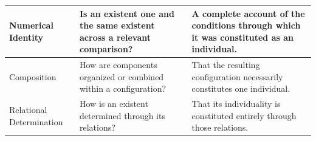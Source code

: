 \begin{table}[htbp]
\begin{tabular}{|p{}|p{}|p{}|}
Numerical Identity
&
Is an existent one and the same existent across a relevant comparison?
&
A complete account of the conditions through which it was constituted as an individual.
\\
\hline

Composition
&
How are components organized or combined within a configuration?
&
That the resulting configuration necessarily constitutes one individual.
\\
\hline

Relational Determination
&
How is an existent determined through its relations?
&
That its individuality is constituted entirely through those relations.
\\
\hline

\end{tabular}
\end{table}

